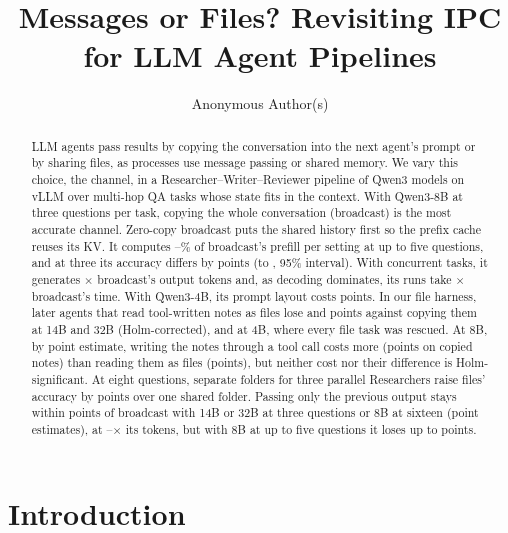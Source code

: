 \documentclass[sigplan,10pt,nonacm,review,anonymous]{acmart}
\begin{document}
\title{Messages or Files? Revisiting IPC for LLM Agent Pipelines}

\author{Anonymous Author(s)}

\begin{abstract}
LLM agents pass results by copying the conversation into the next agent's prompt or by
sharing files, as processes use message passing or shared memory. We vary this choice, the channel,
in a Researcher--Writer--Reviewer pipeline of Qwen3 models on vLLM over multi-hop QA tasks whose state fits
in the context. With Qwen3-8B at three questions per task, copying the whole conversation (broadcast) is the
most accurate channel. Zero-copy broadcast puts the shared history first so the prefix cache reuses its KV.
It computes \nZcRatioMin--\nZcRatioMax{}\% of broadcast's prefill per setting at up to five questions, and at
three its accuracy differs by \nZcPooledDiff points (\nZcPooledDiffLo to \nZcPooledDiffHi, 95\% interval).
With \nConcWord concurrent tasks, it generates \nRSixGenAZc{}$\times$ broadcast's output tokens and, as
decoding dominates, its runs take \nRSixTimeAZc{}$\times$ broadcast's time. With Qwen3-4B, its prompt layout
costs \nPSizeFourGapAZc points. In our file harness, later agents that read tool-written notes
as files lose \nRThirteenFourteenFileToolAbs and \nRThirteenThirtyTwoFileToolAbs points against copying them
at 14B and 32B (Holm-corrected), and \nRThirteenFourFileToolAbs at 4B, where every file task was
rescued. At 8B, by point estimate, writing the notes through a tool call costs more
(\nRFourteenEightWriteCopyAbs points on copied notes) than reading them as files (\nRThirteenEightFileToolAbs points),
but neither cost nor their difference is Holm-significant. At eight
questions, separate folders for three parallel Researchers raise files' accuracy by \nREightFoldersOverB
points over one shared folder. Passing only the previous output stays within \nRThirteenPipeGapMax points of broadcast with
14B or 32B at three questions or 8B at sixteen (point estimates), at
\nRThirteenPipeSentMin--\nRThirteenPipeSentMax{}$\times$ its tokens, but with 8B at up to five questions it
loses up to \nGapATwoMax points.
\end{abstract}

\maketitle

\section{Introduction}
\end{document}
